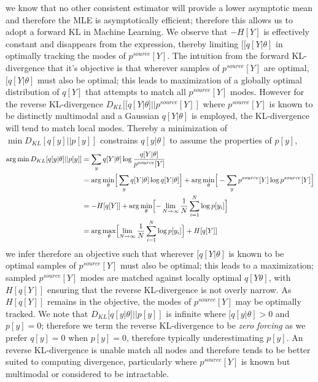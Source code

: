 \documentclass[7pt]{article}
\begin{document}
we know that no other consistent estimator will provide a lower asymptotic mean and therefore the MLE is asymptotically efficient; therefore this allows us to adopt a forward KL in Machine Learning. We observe that $-H[Y]$ is effectively constant and disappears from the expression, thereby limiting $[[q[Y|\theta]$  in optimally tracking the modes of $p^{source}[Y]$.  The intuition  from the forward KL-divergence that it's objective is that wherever samples of $p^{source}[Y]$ are optimal, $[q[Y|\theta]$ must also be optimal; this leads to maximization of a globally optimal distribution of $q[Y]$ that attempts to match all $p^{source}[Y]$ modes. However for the reverse KL-divergence $D_{KL} [[q[Y|\theta]||p^{source}[Y]]$ where $p^{source}[Y]$ is known to be distinctly multimodal and a Gaussian $q[Y|\theta]$ is employed, the KL-divergence will tend to match local modes. Thereby a minimization of $\min D_{KL} [q[y]||p[y]]$ constrains $q[y|\theta]$ to assume the properties of $p[y]$,
\begin{equation}
\begin{split}
\arg \min D_{KL} [q[y|\theta]||p[y]] & = \sum_{y} q[Y|\theta] \log \dfrac{q[Y|\theta]}{p^{source}[Y] }  \\
& =  \arg \min_{\theta} \Bigr[ \sum_{y}  q[Y|\theta]  \log {q[Y|\theta]} \Bigr] + \arg \min_{\theta} \Bigr[ - \sum_{y} p^{source}[Y] \log {p^{source}[Y] } \Bigr] \\
& = -H[q[Y]] + \arg \min_{\theta} \Bigl[ - \lim\limits_{ N \rightarrow \infty } \dfrac{1}{N} \sum^N_{i=1} \log p[y_i]\Bigr]  \\
& = \arg \max_{\theta} \Bigl[ \lim\limits_{ N \rightarrow \infty } \dfrac{1}{N} \sum^N_{i=1} \log p[y_i]\Bigr]  + H[q[Y]]  \\
\end{split}
\end{equation}
we infer therefore an objective such that wherever $[q[Y|\theta]$ is known to be optimal samples of $p^{source}[Y]$ must also be optimal; this leads to a maximization; sampled $p^{source}[Y]$ modes are matched against locally optimal $q[Y\theta]$, with $H[q[Y]]$ ensuring that the reverse KL-divergence is not overly narrow. As $H[q[Y]]$ remains in the objective, the modes of $p^{source}[Y]$ may be optimally tracked. We note that $D_{KL} [q[y|\theta]||p[y]]$ is infinite where $[q[y|\theta] > 0$ and $p[y]=0$; therefore we term the reverse KL-divergence to be \emph{zero forcing} as we prefer $q[y]=0$ when $p[y]=0$, therefore typically underestimating $p[y]$.  An reverse KL-divergence is unable match all nodes and therefore tends to be better suited to computing divergence, particularly where  $p^{source}[Y]$ is known but multimodal or considered to be intractable.
\end{document}
